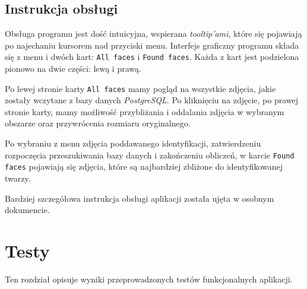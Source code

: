 \documentclass[a4paper,titlepage]{article}
\theoremstyle{break}
\numberwithin{equation}{subsection}
\begin{document}

\subsection{Instrukcja obsługi}

Obsługa programu jest dość intuicyjna, wspierana \emph{tooltip'ami}, które się pojawiają po najechaniu kursorem nad przyciski menu. Interfejs graficzny programu składa się z menu i dwóch kart: \texttt{All faces} i \texttt{Found faces}. Każda z  kart jest podzielona pionowo na dwie części: lewą i prawą.

Po lewej stronie karty \texttt{All~faces} mamy pogląd na wszystkie zdjęcia, jakie zostały wczytane z bazy danych \emph{PostgreSQL}. Po kliknięciu na zdjęcie, po prawej stronie karty, mamy możliwość przybliżania i oddalania zdjęcia w wybranym obszarze oraz przywrócenia rozmiaru oryginalnego.

Po wybraniu z menu zdjęcia poddawanego identyfikacji, zatwierdzeniu rozpoczęcia przeszukiwania bazy danych i zakończeniu obliczeń, w karcie \texttt{Found faces} pojawiają się zdjęcia, które są najbardziej zbliżone do identyfikowanej twarzy. %

Bardziej szczegółowa instrukcja obsługi aplikacji została ujęta w osobnym dokumencie.


\section{Testy}
\label{sec:testy}

Ten rozdział opisuje wyniki przeprowadzonych testów funkcjonalnych aplikacji.


\newpage
\end{document}
